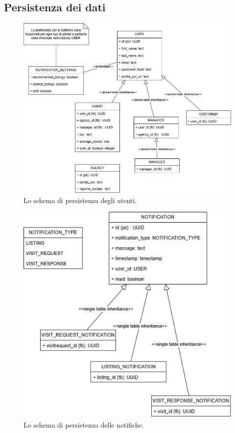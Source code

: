 \subsection{Persistenza dei dati}
\begin{figure}[h]
    \centering
    \includegraphics[width=\textwidth]{assets/diagrams/db-scheme/users.png}
    \caption{Lo schema di persistenza degli utenti.}
    \label{fig:Schema di persistenza degli utenti}
\end{figure}

\begin{figure}[h]
    \centering
    \includegraphics[width=\textwidth]{assets/diagrams/db-scheme/notification.png}
    \caption{Lo schema di persistenza delle notifiche.}
    \label{fig:Schema di persistenza delle notifiche}
\end{figure}

